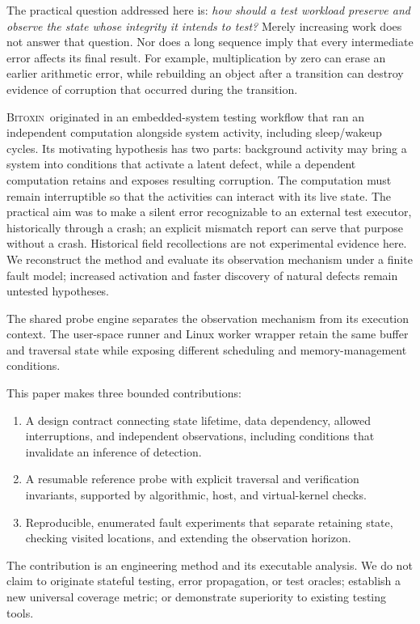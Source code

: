 \documentclass[10pt,twocolumn,letterpaper]{article}
\newcommand{\bx}{\textsc{Bitoxin}}
\begin{document}
The practical question addressed here is: \emph{how should a test workload preserve and observe the state whose integrity it intends to test?} Merely increasing work does not answer that question. Nor does a long sequence imply that every intermediate error affects its final result. For example, multiplication by zero can erase an earlier arithmetic error, while rebuilding an object after a transition can destroy evidence of corruption that occurred during the transition.

\bx\ originated in an embedded-system testing workflow that ran an independent computation alongside system activity, including sleep/wakeup cycles. Its motivating hypothesis has two parts: background activity may bring a system into conditions that activate a latent defect, while a dependent computation retains and exposes resulting corruption. The computation must remain interruptible so that the activities can interact with its live state. The practical aim was to make a silent error recognizable to an external test executor, historically through a crash; an explicit mismatch report can serve that purpose without a crash. Historical field recollections are not experimental evidence here. We reconstruct the method and evaluate its observation mechanism under a finite fault model; increased activation and faster discovery of natural defects remain untested hypotheses.

The shared probe engine separates the observation mechanism from its execution context. The user-space runner and Linux worker wrapper retain the same buffer and traversal state while exposing different scheduling and memory-management conditions.

This paper makes three bounded contributions:
\begin{enumerate}
\item A design contract connecting state lifetime, data dependency, allowed interruptions, and independent observations, including conditions that invalidate an inference of detection.
\item A resumable reference probe with explicit traversal and verification invariants, supported by algorithmic, host, and virtual-kernel checks.
\item Reproducible, enumerated fault experiments that separate retaining state, checking visited locations, and extending the observation horizon.
\end{enumerate}
The contribution is an engineering method and its executable analysis. We do not claim to originate stateful testing, error propagation, or test oracles; establish a new universal coverage metric; or demonstrate superiority to existing testing tools.
\end{document}
